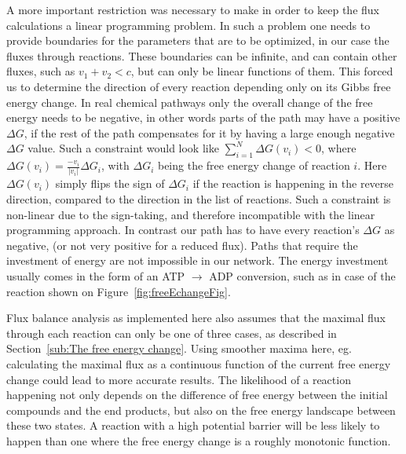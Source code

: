 \documentclass[a4paper,12pt]{article}
\begin{document}
A more important restriction was necessary to make in order to keep the flux calculations a linear programming problem. In such a problem one needs to provide boundaries for the parameters that are to be optimized, in our case the fluxes through reactions. These boundaries can be infinite, and can contain other fluxes, such as $v_1+v_2 < c$, but can only be linear functions of them. This forced us to determine the direction of every reaction depending only on its Gibbs free energy change. In real chemical pathways only the overall change of the free energy needs to be negative, in other words parts of the path may have a positive $\Delta G$, if the rest of the path compensates for it by having a large enough negative $\Delta G$ value. Such a constraint would look like $\sum_{i=1}^N \Delta G \left( v_i \right)<0$, where $\Delta G \left( v_i \right)=\frac{-v_i}{|v_i|} \Delta G_i$, with $\Delta G_i$ being the free energy change of reaction $i$. Here $\Delta G \left( v_i \right)$ simply flips the sign of $\Delta G_i$ if the reaction is happening in the reverse direction, compared to the direction in the list of reactions. Such a constraint is non-linear due to the sign-taking, and therefore incompatible with the linear programming approach. In contrast our path has to have every reaction's $\Delta G$ as negative, (or not very positive for a reduced flux).
Paths that require the investment of energy are not impossible in our network. The energy investment usually comes in the form of an ATP $\rightarrow$ ADP conversion, such as in case of the reaction shown on Figure~\ref{fig:freeEchangeFig}. 

Flux balance analysis as implemented here also assumes that the maximal flux through each reaction can only be one of three cases, as described in Section~\ref{sub:The free energy change}. Using smoother maxima here, eg. calculating the maximal flux as a continuous function of the current free energy change could lead to more accurate results. The likelihood of a reaction happening not only depends on the difference of free energy between the initial compounds and the end products, but also on the free energy landscape between these two states. A reaction with a high potential barrier will be less likely to happen than one where the free energy change is a roughly monotonic function. 


\end{document}
